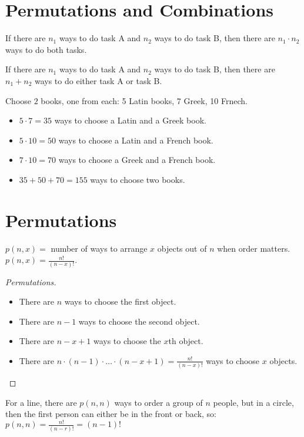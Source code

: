 \section{Permutations and Combinations}
\begin{definition}
    If there are $n_1$ ways to do task A and $n_2$ ways to do task B, then there are $n_1 \cdot n_2$ ways to do both tasks.
\end{definition}

\begin{definition}
    If there are $n_1$ ways to do task A and $n_2$ ways to do task B, then there are $n_1 + n_2$ ways to do either task A or task B.
\end{definition}

\begin{example}
    Choose $2$ books, one from each: 5 Latin books, 7 Greek, 10 Frnech.
    \begin{itemize}
        \item $5 \cdot 7 = 35$ ways to choose a Latin and a Greek book.
        \item $5 \cdot 10 = 50$ ways to choose a Latin and a French book.
        \item $7 \cdot 10 = 70$ ways to choose a Greek and a French book.
        \item $35 + 50 + 70 = 155$ ways to choose two books.
    \end{itemize}

\end{example}
\section{Permutations}
\begin{vocabulary}
    $p(n,x) = $ number of ways to arrange $x$ objects out of $n$ when order matters. \\
    $p(n,x) = \frac{n!}{(n-x)!}$.
\end{vocabulary}

\begin{proof}
    [Permutations]
    \begin{itemize}
        \item There are $n$ ways to choose the first object.
        \item There are $n-1$ ways to choose the second object.
        \item There are $n-x+1$ ways to choose the $x$th object.
        \item There are $n \cdot (n-1) \cdot \ldots \cdot (n-x+1) = \frac{n!}{(n-x)!}$ ways to choose $x$ objects.
    \end{itemize}
\end{proof}
\begin{example}
    For a line, there are $p(n,n)$ ways to order a group of $n$ people, but in a circle, then the first person can either be in the front or back, so: $p(n,n) = \frac{n!}{(n-r)!} = (n-1)!$
\end{example}


